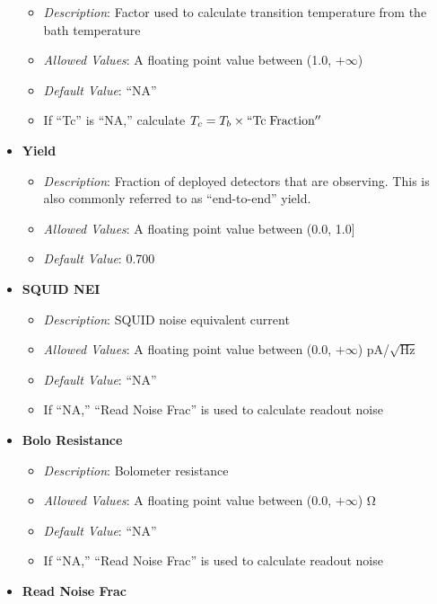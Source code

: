 \documentclass[11pt]{article} %
\begin{document}
\begin{itemize}[noitemsep,topsep=0pt]
		\begin{itemize}[noitemsep,topsep=0pt]
		\item \textit{Description}: Factor used to calculate transition temperature from the bath temperature 
		\item \textit{Allowed Values}: A floating point value between (1.0, $+\infty$)
		\item \textit{Default Value}: ``NA''
		\item If ``Tc'' is ``NA,'' calculate $T_{c} = T_{b} \times \mathrm{``Tc \; Fraction''}$
		\end{itemize}
	\item \textbf{Yield}
		\begin{itemize}[noitemsep,topsep=0pt]
		\item \textit{Description}: Fraction of deployed detectors that are observing. This is also commonly referred to as ``end-to-end'' yield. 
		\item \textit{Allowed Values}: A floating point value between (0.0, 1.0]
		\item \textit{Default Value}: 0.700
		\end{itemize}
	\item \textbf{SQUID NEI}
		\begin{itemize}[noitemsep,topsep=0pt]
		\item \textit{Description}: SQUID noise equivalent current 
		\item \textit{Allowed Values}: A floating point value between (0.0, $+\infty$) pA/$\sqrt{\mathrm{Hz}}$
		\item \textit{Default Value}: ``NA''
		\item If ``NA,'' ``Read Noise Frac'' is used to calculate readout noise
		\end{itemize}
	\item \textbf{Bolo Resistance}
		\begin{itemize}[noitemsep,topsep=0pt]
		\item \textit{Description}: Bolometer resistance 
		\item \textit{Allowed Values}: A floating point value between (0.0, $+\infty$) $\mathrm{\Omega}$
		\item \textit{Default Value}: ``NA''
		\item If ``NA,'' ``Read Noise Frac'' is used to calculate readout noise
		\end{itemize}
	\item \textbf{Read Noise Frac}
		\begin{itemize}[noitemsep,topsep=0pt]

\end{itemize}
\end{itemize}
\end{document}
